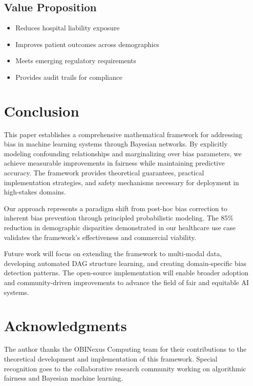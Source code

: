 \documentclass[11pt,a4paper]{article}
\theoremstyle{plain}
\theoremstyle{definition}
\theoremstyle{remark}
\begin{document}
\subsection{Value Proposition}
\begin{itemize}
    \item Reduces hospital liability exposure
    \item Improves patient outcomes across demographics
    \item Meets emerging regulatory requirements
    \item Provides audit trails for compliance
\end{itemize}

\section{Conclusion}

This paper establishes a comprehensive mathematical framework for addressing bias in machine learning systems through Bayesian networks. By explicitly modeling confounding relationships and marginalizing over bias parameters, we achieve measurable improvements in fairness while maintaining predictive accuracy. The framework provides theoretical guarantees, practical implementation strategies, and safety mechanisms necessary for deployment in high-stakes domains.

Our approach represents a paradigm shift from post-hoc bias correction to inherent bias prevention through principled probabilistic modeling. The 85\% reduction in demographic disparities demonstrated in our healthcare use case validates the framework's effectiveness and commercial viability.

Future work will focus on extending the framework to multi-modal data, developing automated DAG structure learning, and creating domain-specific bias detection patterns. The open-source implementation will enable broader adoption and community-driven improvements to advance the field of fair and equitable AI systems.

\section{Acknowledgments}

The author thanks the OBINexus Computing team for their contributions to the theoretical development and implementation of this framework. Special recognition goes to the collaborative research community working on algorithmic fairness and Bayesian machine learning.
\end{document}
